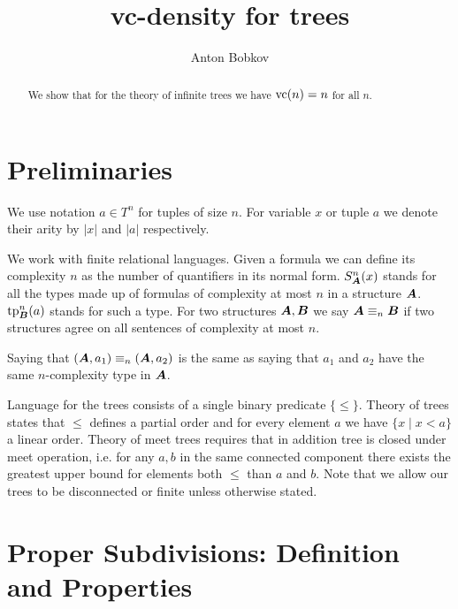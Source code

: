 \documentclass{amsart}
\DeclareMathOperator{\A}{\boldface A}
\DeclareMathOperator{\B}{\boldface B}
\begin{document}
\title{vc-density for trees}
\author{Anton Bobkov}

\begin{abstract}
	We show that for the theory of infinite trees we have $\operatorname{vc}(n) = n$ for all $n$.
\end{abstract}

\maketitle

\section{Preliminaries}
We use notation $a \in T^n$ for tuples of size $n$. For variable $x$ or tuple $a$ we denote their arity by $|x|$ and $|a|$ respectively.

We work with finite relational languages. Given a formula we can define its complexity $n$ as the number of quantifiers in its normal form. $S^n_{\A}(x)$ stands for all the types made up of formulas of complexity at most $n$ in a structure $\A$. $\tp^n_{\B}(a)$ stands for such a type. For two structures $\A, \B$ we say $\A \equiv_n \B$ if two structures agree on all sentences of complexity at most $n$.

\begin{Note}
	Saying that $(\A, a_1) \equiv_n (\A, a_2)$ is the same as saying that $a_1$ and $a_2$ have the same $n$-complexity type in $\A$.
\end{Note}

Language for the trees consists of a single binary predicate $\{\leq\}$. Theory of trees states that $\leq$ defines a partial order and for every element $a$ we have $\{x \mid x < a\}$ a linear order. Theory of meet trees requires that in addition tree is closed under meet operation, i.e. for any $a, b$ in the same connected component there exists the greatest upper bound for elements both $\leq$ than $a$ and $b$. Note that we allow our trees to be disconnected or finite unless otherwise stated.

\section{Proper Subdivisions: Definition and Properties}
\end{document}
